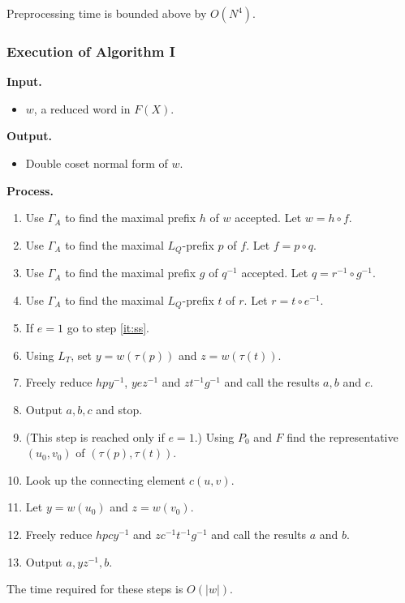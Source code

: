 \documentclass[a4paper,12pt]{article}
\newcommand{\G}{\Gamma }
\renewcommand{\t}{\tau }
\numberwithin{equation}{section}
\numberwithin{figure}{section}
\newcommand{\be}{\begin{enumerate}}
\newcommand{\ee}{\end{enumerate}}
\newcommand{\biz}{\begin{itemize}}
\newcommand{\eiz}{\end{itemize}}
\begin{document}
Preprocessing time is bounded above by $O(N^4)$. 
\subsubsection{Execution of Algorithm I}
\noindent\textbf{Input.}
\biz
\item $w$, a reduced word in $F(X)$.
\eiz
\noindent\textbf{Output.} 
\biz
\item Double coset normal form of $w$. 
\eiz
\noindent\textbf{Process.}
\be
\item Use $\G_A$ to find the maximal prefix $h$ of $w$ accepted. 
Let $w=h\circ f$. 
\item Use $\G_A$ to find the maximal $L_Q$-prefix $p$ of $f$. 
Let $f=p\circ q$.
\item Use $\G_A$ to find the maximal prefix $g$ of $q^{-1}$ accepted.
Let $q=r^{-1}\circ g^{-1}$.
\item Use $\G_A$ to find the maximal $L_Q$-prefix $t$ of $r$. 
Let $r=t\circ e^{-1}$. 
\item If $e=1$ go to step \ref{it:ss}.
\item Using $L_T$, set $y=w(\t(p))$ and $z=w(\t(t))$.
\item Freely reduce $hpy^{-1}$, $yez^{-1}$ and $zt^{-1}g^{-1}$ and 
call the results   $a, b$ and $c$. 
\item Output $a,b,c$ and stop.
\item\label{it:ss} (This step is reached only if $e= 1$.)
 Using $P_0$ and $F$ find the representative $(u_0,v_0)$ of $(\t(p),\t(t))$.
\item Look up the connecting element $c(u,v)$. 
\item Let $y=w(u_0)$ and $z=w(v_0)$. 
\item Freely reduce $hpcy^{-1}$ and $zc^{-1}t^{-1}g^{-1}$ and call the 
results $a$ and $b$.
\item Output $a,yz^{-1},b$.
\ee
The time required for these steps is $O(|w|)$. 
\end{document}
